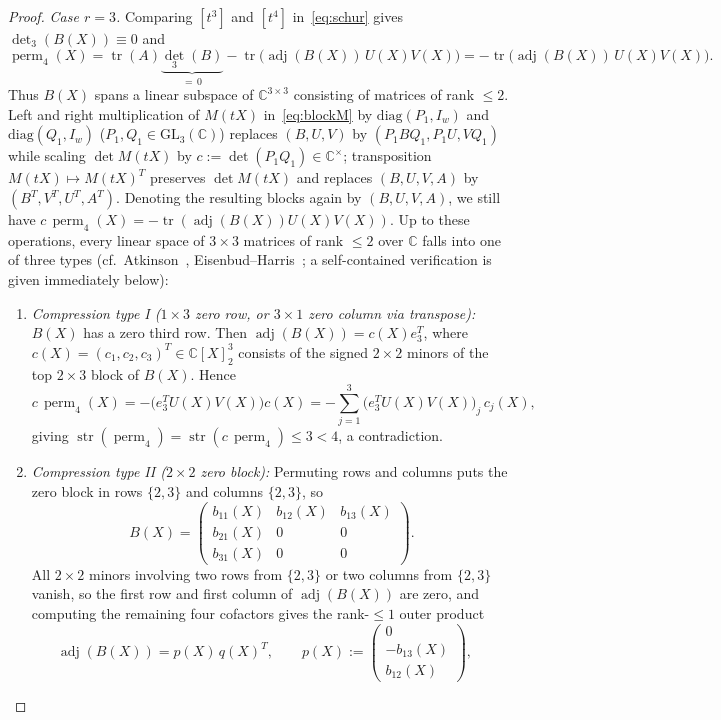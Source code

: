 \documentclass[11pt,a4paper]{article}
\theoremstyle{definition}
\DeclareMathOperator{\perm}{perm}
\DeclareMathOperator{\str}{str}
\DeclareMathOperator{\tr}{tr}
\DeclareMathOperator{\adj}{adj}
\begin{document}
\begin{proof}
\emph{Case $r = 3$.} Comparing $[t^3]$ and $[t^4]$ in~\eqref{eq:schur} gives $\det_3(B(X)) \equiv 0$ and
\[
  \perm_4(X) = \tr(A)\underbrace{\det_3(B)}_{=\,0} - \tr\!\big(\adj(B(X))\, U(X) V(X)\big)
  = -\tr\!\big(\adj(B(X))\, U(X) V(X)\big).
\]
Thus $B(X)$ spans a linear subspace of $\mathbb{C}^{3\times 3}$ consisting of matrices of rank $\le 2$. Left and right multiplication of $M(tX)$ in~\eqref{eq:blockM} by $\mathrm{diag}(P_1, I_w)$ and $\mathrm{diag}(Q_1, I_w)$ ($P_1, Q_1 \in \mathrm{GL}_3(\mathbb{C})$) replaces $(B, U, V)$ by $(P_1 B Q_1, P_1 U, V Q_1)$ while scaling $\det M(tX)$ by $c := \det(P_1 Q_1) \in \mathbb{C}^\times$; transposition $M(tX) \mapsto M(tX)^T$ preserves $\det M(tX)$ and replaces $(B, U, V, A)$ by $(B^T, V^T, U^T, A^T)$. Denoting the resulting blocks again by $(B, U, V, A)$, we still have $c\,\perm_4(X) = -\tr(\adj(B(X)) U(X) V(X))$. Up to these operations, every linear space of $3 \times 3$ matrices of rank $\le 2$ over $\mathbb{C}$ falls into one of three types (cf.\ Atkinson~\cite{Atkinson1983}, Eisenbud--Harris~\cite{EH1988}; a self-contained verification is given immediately below):
\begin{enumerate}
  \item \emph{Compression type I ($1\times 3$ zero row, or $3\times 1$ zero column via transpose):} $B(X)$ has a zero third row. Then $\adj(B(X)) = c(X) e_3^T$, where $c(X) = (c_1,c_2,c_3)^T \in \mathbb{C}[X]_2^3$ consists of the signed $2\times 2$ minors of the top $2\times 3$ block of $B(X)$. Hence
  \[
    c\,\perm_4(X) = -\big(e_3^T U(X) V(X)\big) c(X) = -\sum_{j=1}^3 \big(e_3^T U(X) V(X)\big)_j\, c_j(X),
  \]
  giving $\str(\perm_4) = \str(c\,\perm_4) \le 3 < 4$, a contradiction.
  \item \emph{Compression type II ($2\times 2$ zero block):} Permuting rows and columns puts the zero block in rows $\{2,3\}$ and columns $\{2,3\}$, so
  \[
    B(X) = \begin{pmatrix} b_{11}(X) & b_{12}(X) & b_{13}(X) \\ b_{21}(X) & 0 & 0 \\ b_{31}(X) & 0 & 0 \end{pmatrix}.
  \]
  All $2\times 2$ minors involving two rows from $\{2,3\}$ or two columns from $\{2,3\}$ vanish, so the first row and first column of $\adj(B(X))$ are zero, and computing the remaining four cofactors gives the rank-$\le 1$ outer product
  \[
    \adj(B(X)) = p(X)\, q(X)^T, \qquad
    p(X) := \begin{pmatrix} 0 \\ -b_{13}(X) \\ b_{12}(X) \end{pmatrix}, \quad
\]
\end{enumerate}
\end{proof}
\end{document}
